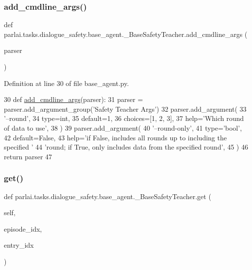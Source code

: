 \subsubsection{\texorpdfstring{add\+\_\+cmdline\+\_\+args()}{add\_cmdline\_args()}}
{\footnotesize\ttfamily def parlai.\+tasks.\+dialogue\+\_\+safety.\+base\+\_\+agent.\+\_\+\+Base\+Safety\+Teacher.\+add\+\_\+cmdline\+\_\+args (\begin{DoxyParamCaption}\item[{}]{parser }\end{DoxyParamCaption})\hspace{0.3cm}{\ttfamily [static]}}



Definition at line 30 of file base\+\_\+agent.\+py.


\begin{DoxyCode}
30     \textcolor{keyword}{def }\hyperlink{namespaceparlai_1_1agents_1_1drqa_1_1config_a62fdd5554f1da6be0cba185271058320}{add\_cmdline\_args}(parser):
31         parser = parser.add\_argument\_group(\textcolor{stringliteral}{'Safety Teacher Args'})
32         parser.add\_argument(
33             \textcolor{stringliteral}{'--round'},
34             type=int,
35             default=1,
36             choices=[1, 2, 3],
37             help=\textcolor{stringliteral}{'Which round of data to use'},
38         )
39         parser.add\_argument(
40             \textcolor{stringliteral}{'--round-only'},
41             type=\textcolor{stringliteral}{'bool'},
42             default=\textcolor{keyword}{False},
43             help=\textcolor{stringliteral}{'if False, includes all rounds up to including the specified '}
44             \textcolor{stringliteral}{'round; if True, only includes data from the specified round'},
45         )
46         \textcolor{keywordflow}{return} parser
47 
\end{DoxyCode}
\mbox{\label{classparlai_1_1tasks_1_1dialogue__safety_1_1base__agent_1_1__BaseSafetyTeacher_afde2a1fdb6fa5aa3da3544624f8068b6}} 
\subsubsection{\texorpdfstring{get()}{get()}}
{\footnotesize\ttfamily def parlai.\+tasks.\+dialogue\+\_\+safety.\+base\+\_\+agent.\+\_\+\+Base\+Safety\+Teacher.\+get (\begin{DoxyParamCaption}\item[{}]{self,  }\item[{}]{episode\+\_\+idx,  }\item[{}]{entry\+\_\+idx }\end{DoxyParamCaption})}



